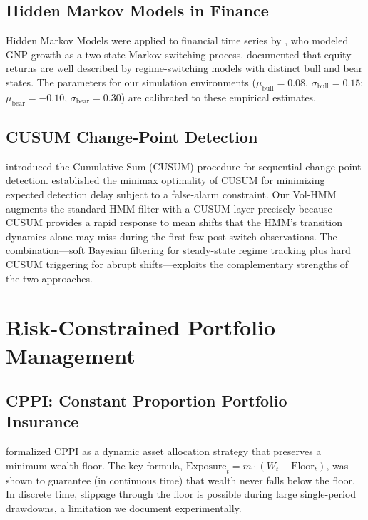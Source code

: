 \subsection{Hidden Markov Models in Finance}

Hidden Markov Models were applied to financial time series by \citet{hamilton1989new},
who modeled GNP growth as a two-state Markov-switching process.  \citet{ang2002regime} documented that
equity returns are well described by regime-switching models with distinct bull
and bear states.  The parameters for our simulation environments
($\mu_{\text{bull}} = 0.08$, $\sigma_{\text{bull}} = 0.15$;
$\mu_{\text{bear}} = -0.10$, $\sigma_{\text{bear}} = 0.30$) are calibrated to
these empirical estimates.

\subsection{CUSUM Change-Point Detection}

\citet{page1954} introduced the Cumulative Sum (CUSUM) procedure for sequential
change-point detection.  \citet{moustakides1986optimal} established the minimax optimality of
CUSUM for minimizing expected detection delay subject to a false-alarm
constraint.  Our Vol-HMM augments the standard HMM filter with a CUSUM layer
precisely because CUSUM provides a rapid response to mean shifts that the
HMM's transition dynamics alone may miss during the first few post-switch
observations.  The combination---soft Bayesian filtering for steady-state
regime tracking plus hard CUSUM triggering for abrupt shifts---exploits the
complementary strengths of the two approaches.

\section{Risk-Constrained Portfolio Management}

\subsection{CPPI: Constant Proportion Portfolio Insurance}

\citet{black1992theory} formalized CPPI as a dynamic asset allocation strategy
that preserves a minimum wealth floor.  The key formula,
$\text{Exposure}_t = m \cdot (W_t - \text{Floor}_t)$, was shown to guarantee
(in continuous time) that wealth never falls below the floor.  In discrete time,
slippage through the floor is possible during large single-period drawdowns, a
limitation we document experimentally.


